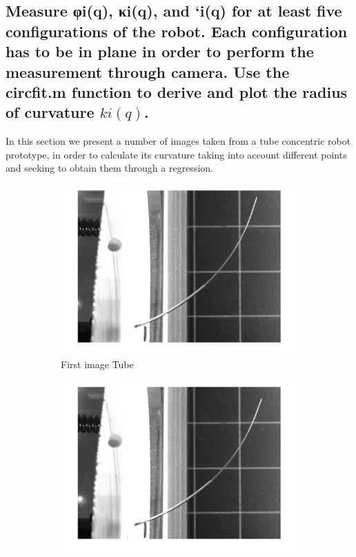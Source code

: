 \documentclass[12pt, twoside]{report}
\begin{document}
\subsection{Measure φi(q), κi(q), and ‘i(q) for at least five configurations of the robot. Each configuration
has to be in plane in order to perform the measurement through camera. Use the circfit.m function to
derive and plot the radius of curvature $ki(q)$.}

In this section we present a number of images taken from a tube concentric robot prototype, in order to calculate its curvature taking into account different points and seeking to obtain them through a regression.

\begin{figure}[H]
     \centering
     \begin{subfigure}[b]{0.3\textwidth}
         \centering
         \includegraphics[width=\textwidth]{TP_1/curve1i.jpg}
         \caption{First image Tube}
         \label{fig:process1}
     \end{subfigure}
     \hfill
     \begin{subfigure}[b]{0.3\textwidth}
         \centering
         \includegraphics[width=\textwidth]{TP_1/curve2i.jpg}

\end{subfigure}
\end{figure}
\end{document}
